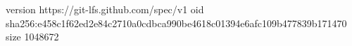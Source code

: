 version https://git-lfs.github.com/spec/v1
oid sha256:e458c1f62ed2e84c2710a0cdbca990be4618c01394e6afc109b477839b171470
size 1048672
